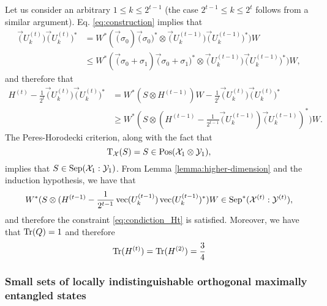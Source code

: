 Let us consider an arbitrary $1 \leq k \leq 2^{t-1}$ 
(the case $2^{t-1} \leq k \leq 2^{t}$ follows from a similar argument).
Eq. \eqref{eq:construction} implies that
\begin{equation}
  \begin{split}
    \vec(U_{k}^{(t)})\vec(U_{k}^{(t)})^{\ast}  
        &= W^{\ast}(\vec(\sigma_{0})\vec(\sigma_{0})^{\ast}\otimes 
          \vec(U_{k}^{(t-1)})\vec(U_{k}^{(t-1)})^{\ast})W \\
        &\leq 
         W^{\ast}(\vec(\sigma_{0} + \sigma_{1})\vec(\sigma_{0} + \sigma_{1})^{\ast} 
          \otimes \vec(U_{k}^{(t-1)})\vec(U_{k}^{(t-1)})^{\ast})W,
  \end{split} 
\end{equation}
and therefore that
\begin{align}
  H^{(t)} - \frac{1}{2^{t}}\vec(U_{k}^{(t)})\vec(U_{k}^{(t)})^{\ast} 
    &= W^{\ast}(S \otimes H^{(t-1)})W - 
      \frac{1}{2^{t}}\vec(U_{k}^{(t)})\vec(U_{k}^{(t)})^{\ast}\\
    &\geq W^{\ast}(S \otimes (H^{(t-1)} - 
          \frac{1}{2^{t-1}}\vec(U_{k}^{(t-1)})\vec(U_{k}^{(t-1)})^{\ast})W.
\end{align}
The Peres-Horodecki criterion, along with the fact that
\[
  \operatorname{T}_{\mathcal{X}}(S) = S \in \mathrm{Pos}(\mathcal{X}_{1}\otimes\mathcal{Y}_{1}),
\] 
implies that $S\in\mathrm{Sep}(\mathcal{X}_{1}:\mathcal{Y}_{1})$. 
From Lemma \ref{lemma:higher-dimension} and the induction hypothesis, we have that
\begin{equation}
  W^{\ast}(S \otimes (H^{(t-1)} - 
      \frac{1}{2^{t-1}}\operatorname{vec}(U_{k}^{(t-1)})\operatorname{vec}(U_{k}^{(t-1)})^{\ast})W 
        \in \mathrm{Sep}^{\ast}(\mathcal{X}^{(t)}:\mathcal{Y}^{(t)}),
\end{equation}
and therefore the constraint \eqref{eq:condiction_Ht} is satisfied.
Moreover, we have that $\operatorname{Tr}(Q) = 1$ and therefore
\[
  \operatorname{Tr}(H^{(t)}) = \operatorname{Tr}(H^{(2)}) = \frac{3}{4}
\]

\subsubsection*{Small sets of locally indistinguishable orthogonal maximally entangled states}

